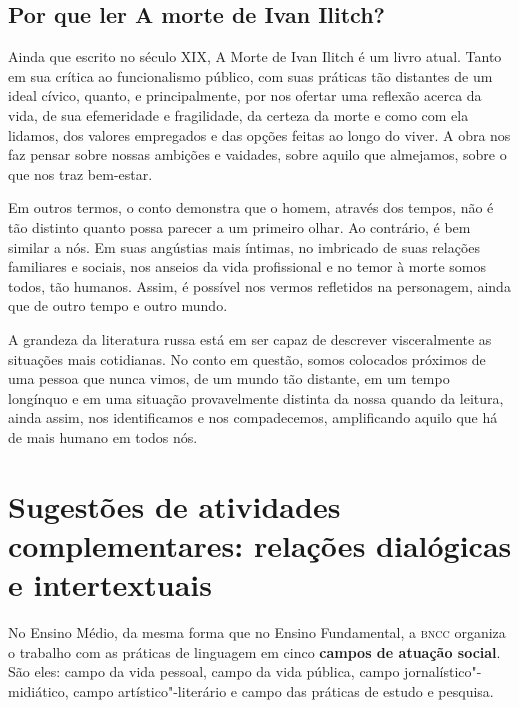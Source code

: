 \documentclass[12pt]{extarticle}
\begin{document}
\subsection{Por que ler A morte de Ivan Ilitch?}

Ainda que escrito no século XIX, A Morte de Ivan Ilitch é um livro
atual. Tanto em sua crítica ao funcionalismo público, com suas práticas
tão distantes de um ideal cívico, quanto, e principalmente, por nos
ofertar uma reflexão acerca da vida, de sua efemeridade e fragilidade,
da certeza da morte e como com ela lidamos, dos valores empregados e das
opções feitas ao longo do viver. A obra nos faz pensar sobre nossas
ambições e vaidades, sobre aquilo que almejamos, sobre o que nos traz
bem-estar.

Em outros termos, o conto demonstra que o homem, através dos tempos, não
é tão distinto quanto possa parecer a um primeiro olhar. Ao contrário, é
bem similar a nós. Em suas angústias mais íntimas, no imbricado de suas
relações familiares e sociais, nos anseios da vida profissional e no
temor à morte somos todos, tão humanos. Assim, é possível nos vermos
refletidos na personagem, ainda que de outro tempo e outro mundo.

A grandeza da literatura russa está em ser capaz de descrever
visceralmente as situações mais cotidianas. No conto em questão, somos
colocados próximos de uma pessoa que nunca vimos, de um mundo tão
distante, em um tempo longínquo e em uma situação provavelmente distinta
da nossa quando da leitura, ainda assim, nos identificamos e nos
compadecemos, amplificando aquilo que há de mais humano em todos nós.






\section{Sugestões de atividades complementares: relações dialógicas e
intertextuais}


No Ensino Médio, da mesma forma que no Ensino Fundamental, a \textsc{bncc}
organiza o trabalho com as práticas de linguagem em cinco \textbf{campos
de atuação social}. São eles: campo da vida pessoal, campo da vida
pública, campo jornalístico"-midiático, campo artístico"-literário e campo
das práticas de estudo e pesquisa.
\end{document}
